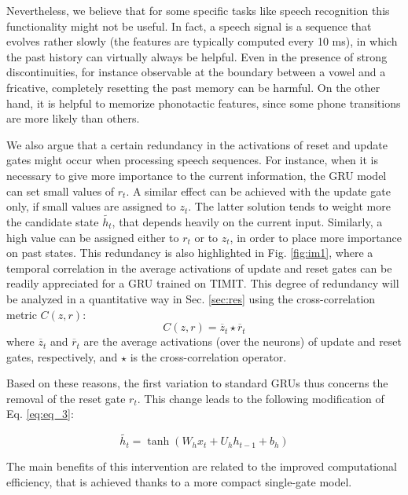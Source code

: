 \documentclass[journal]{IEEEtran}
\begin{document}
Nevertheless, we believe that for some specific tasks like speech recognition this functionality might not be useful. 
In fact, a speech signal is a sequence that evolves rather slowly (the features are typically computed every 10 ms), in which the past history can virtually always be helpful.  
Even in the presence of strong discontinuities, for instance observable at the boundary between a vowel and a fricative, completely resetting the past memory can be harmful. On the other hand, it is helpful to memorize phonotactic features, since some phone transitions are more likely than others.

We also argue that a certain redundancy in the activations of reset and update gates might occur when processing speech sequences.  For instance, when it is necessary to give more importance to the current information,  the GRU model can set small values of $r_{t}$. A similar effect can be achieved with the update gate only, if small values are assigned to $z_{t}$. The latter solution tends to weight more the candidate state $\widetilde{h_{t}}$, that depends heavily on the current input. 
Similarly, 
a high value can be assigned either to $r_{t}$ or to $z_{t}$, in order to place more importance on past states. 
This redundancy is also highlighted in Fig. \ref{fig:im1}, where a temporal correlation in the average activations of update and reset gates 
can be readily appreciated for a GRU trained on TIMIT. This degree of redundancy will be analyzed in a quantitative way in Sec. \ref{sec:res} using the cross-correlation metric $C(z,r)$:
\begin{equation}
C(z,r)=\overline{z}_t \star \overline{r}_t
\label{eq:cross}
\end{equation}
where $\overline{z}_t$ and $\overline{r}_t$ are the average activations (over the neurons) of update and reset gates, respectively, and $\star$ is the cross-correlation operator.

Based on these reasons, the first variation to standard GRUs thus concerns the removal of the reset gate $r_{t}$. This change leads to the following modification of Eq. \ref{eq:eq_3}:

\begin{equation}
\widetilde{h_{t}}=\tanh(W_{h}x_{t}+U_{h} h_{t-1}+b_{h})
\end{equation}

The main benefits of this intervention are related to the improved computational efficiency, that is achieved thanks to a more compact single-gate model.
\end{document}
